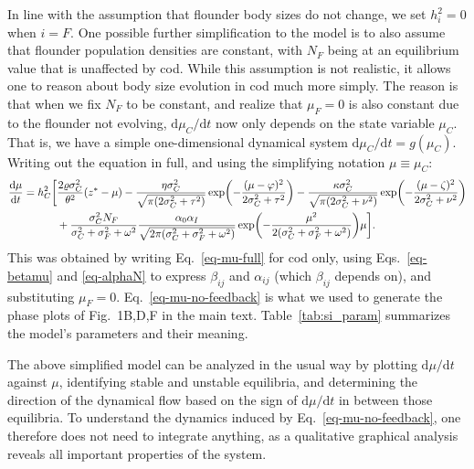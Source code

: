 \documentclass{article}
\newcommand{\ud}{\text{d}}
\let\originalleft\left
\let\originalright\right
\renewcommand{\left}{\mathopen{}\mathclose\bgroup\originalleft}
\renewcommand{\right}{\aftergroup\egroup\originalright}
\begin{document}
In line with the assumption that flounder body sizes do not change, we set $h_i^2 = 0$ when $i = F$. One possible further simplification to the model is to also assume that flounder population densities are constant, with $N_F$ being at an equilibrium value that is unaffected by cod. While this assumption is not realistic, it allows one to reason about body size evolution in cod much more simply. The reason is that when we fix $N_F$ to be constant, and realize that $\mu_F = 0$ is also constant due to the flounder not evolving, $\ud \mu_C / \ud t$ now only depends on the state variable $\mu_C$. That is, we have a simple one-dimensional dynamical system $\ud \mu_C / \ud t = g(\mu_C)$. Writing out the equation in full, and using the simplifying notation $\mu \equiv \mu_C$:
\begin{equation}
  \label{eq-mu-no-feedback}
  \begin{split}
    \frac{\ud \mu}{\ud t}
    = h_C^2 \bigg[ &
    \frac{2\varrho\sigma_C^2}{\theta^2}\left(z^*-\mu\right)-
    \frac{\eta\sigma_C^2}{\sqrt{\pi(2\sigma_C^2+\tau^2)}}
    \exp\left( -\frac{(\mu-\varphi)^2}
    {2\sigma_C^2+\tau^2}\right) -
    \frac{\kappa\sigma_C^2}{\sqrt{\pi(2\sigma_C^2+\nu^2)}}
    \exp\left(
    -\frac{(\mu-\zeta)^2}{2\sigma_C^2+\nu^2} \right)
    \\ &+ \frac{\sigma_C^2 N_F}
    {\sigma_C^2 + \sigma_F^2 + \omega^2}
    \frac{\alpha_0 \alpha_I}
    {\sqrt{2\pi(\sigma_C^2 + \sigma_F^2 + \omega^2)}}
    \exp \left( -\frac{\mu^2}
    {2(\sigma_C^2 + \sigma_F^2 + \omega^2)} \right)
    \mu \bigg] .
  \end{split}
\end{equation}
This was obtained by writing Eq.~\ref{eq-mu-full} for cod only, using Eqs.~\ref{eq-betamu} and \ref{eq-alphaN} to express $\beta_{ij}$ and $\alpha_{ij}$ (which $\beta_{ij}$ depends on), and substituting $\mu_F = 0$. Eq.~\ref{eq-mu-no-feedback} is what we used to generate the phase plots of Fig.~1B,D,F in the main text. Table~\ref{tab:si_param} summarizes the model's parameters and their meaning.

The above simplified model can be analyzed in the usual way by plotting $\ud \mu / \ud t$ against $\mu$, identifying stable and unstable equilibria, and determining the direction of the dynamical flow based on the sign of $\ud \mu / \ud t$ in between those equilibria. To understand the dynamics induced by Eq.~\ref{eq-mu-no-feedback}, one therefore does not need to integrate anything, as a qualitative graphical analysis reveals all important properties of the system.
\end{document}
